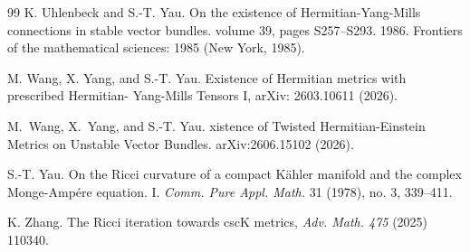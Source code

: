 \documentclass[11pt]{amsart}
\numberwithin{equation}{section}
\theoremstyle{remark}
\begin{document}
\begin{thebibliography}{99}
K. Uhlenbeck and S.-T. Yau. On the existence of Hermitian-Yang-Mills connections in stable vector bundles. volume 39, pages S257–S293. 1986. Frontiers of the mathematical sciences: 1985 (New York, 1985).

M. Wang, X. Yang, and S.-T. Yau. Existence of Hermitian metrics with prescribed Hermitian- Yang-Mills Tensors I, arXiv: 2603.10611 (2026).




M.~Wang, X.~Yang, and S.-T. Yau.
xistence of {T}wisted {H}ermitian-{E}instein {M}etrics on
  {U}nstable {V}ector {B}undles.
\newblock arXiv:2606.15102 (2026).

S.-T. Yau. On the Ricci curvature of a compact Kähler manifold and the complex Monge-Amp\'ere equation. I. {\it Comm. Pure Appl. Math.} 31 (1978), no. 3, 339–411.

K. Zhang. The Ricci iteration towards cscK metrics, {\it Adv. Math. 475} (2025) 110340.

\end{thebibliography}

	
\end{document}
